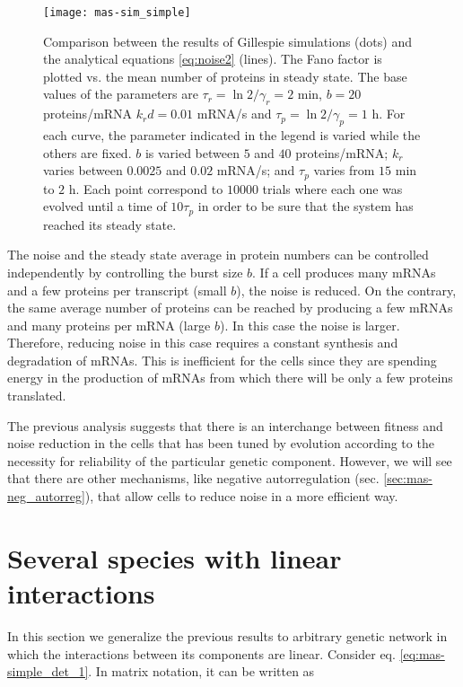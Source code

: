 \begin{figure}[H]
  \centering
  \texttt{[image: mas-sim\_simple]}
  \caption[Noise in proteins: comparing analytical results and Gillespie simulations]{\label{fig:mas-sim_simple} Comparison between the results of Gillespie simulations (dots) and the analytical equations \eqref{eq:noise2} (lines). The Fano factor is plotted vs. the mean number of proteins in steady state. The base values of the parameters are $\tau_r = \ln2/\gamma_r = 2$ min,  $b=20$ proteins/mRNA $k_rd = 0.01$ mRNA/s and $\tau_p = \ln2/\gamma_p = 1$ h. For each curve, the parameter indicated in the legend is varied while the others are fixed. $b$ is varied between $5$ and $40$ proteins/mRNA; $k_r$ varies between $0.0025$ and $0.02$ mRNA/s; and $\tau_p$ varies from $15$ min to $2$ h. Each point correspond to $10000$ trials where each one was evolved until a time of $10\tau_p$ in order to be sure that the system has reached its steady state.}
\end{figure}

The noise and the steady state average in protein numbers can be controlled independently by controlling the burst size $b$. If a cell produces many mRNAs and a few proteins per transcript (small $b$), the noise is reduced. On the contrary, the same average number of proteins can be reached by producing a few mRNAs and many proteins per mRNA (large $b$). In this case the noise is larger. Therefore, reducing noise in this case requires a constant synthesis and degradation of mRNAs. This is inefficient for the cells since they are spending energy in the production of mRNAs from which there will be only a few proteins translated. 

The previous analysis suggests that there is an interchange between fitness and noise reduction in the cells that has been tuned by evolution according to the necessity for reliability of the particular genetic component. However, we will see that there are other mechanisms, like negative autorregulation (sec. \ref{sec:mas-neg_autorreg}), that allow cells to reduce noise in a more efficient way.

\section{Several species with linear interactions}

In this section we generalize the previous results to arbitrary genetic network in which the interactions between its components are linear. Consider eq. \eqref{eq:mas-simple_det_1}. In matrix notation, it can be written as


